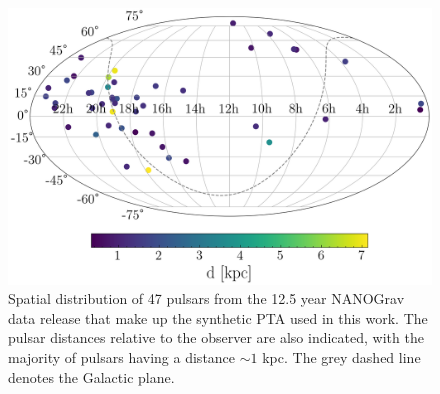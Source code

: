 \documentclass[fleqn,usenatbib,useAMS]{mnras}
\begin{document}
\begin{figure}
	\includegraphics[width=\columnwidth]{images/pulsar_distribution}
	\caption{Spatial distribution of 47 pulsars from the 12.5 year NANOGrav data release that make up the synthetic PTA used in this work. The pulsar distances relative to the observer are also indicated, with the majority of pulsars having a distance $\sim 1$ kpc. The grey dashed line denotes the Galactic plane.}
	\label{fig:pulsar_distrib}
\end{figure}
\end{document}
